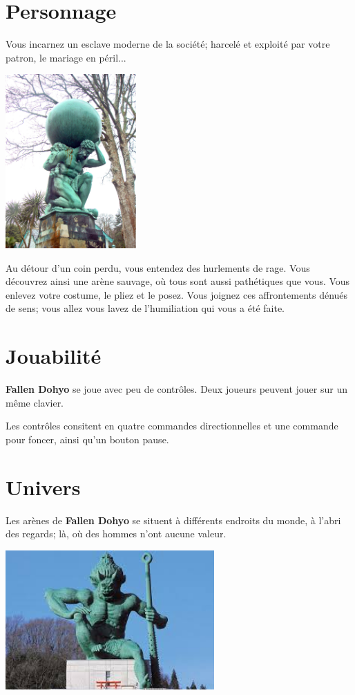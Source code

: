 \documentclass[french]{report}
\newcommand{\gamename}{\textbf{Fallen Dohyo} }
\begin{document}
\section{Personnage}

    Vous incarnez un esclave moderne de la société;
    harcelé et exploité par votre patron, le mariage en péril...

\begin{center}
    \includegraphics[width=5cm]{hercules}
\end{center}

    Au détour d'un coin perdu,
    vous entendez des hurlements de rage.
    Vous découvrez ainsi une arène sauvage,
    où tous sont aussi pathétiques que vous.
    Vous enlevez votre costume, le pliez et le posez.
    Vous joignez ces affrontements dénués de sens;
    vous allez vous lavez de l'humiliation
    qui vous a été faite.

\section{Jouabilité}

    \gamename se joue avec peu de contrôles.
    Deux joueurs peuvent jouer sur un même clavier.

    Les contrôles consitent en quatre commandes directionnelles
    et une commande pour foncer, ainsi qu'un bouton pause.

\section{Univers}

    Les arènes de \gamename se situent
    à différents endroits du monde,
    à l'abri des regards;
    là, où des hommes n'ont aucune valeur.

\begin{center}
    \includegraphics[width=8cm]{oni}
\end{center}
\end{document}
